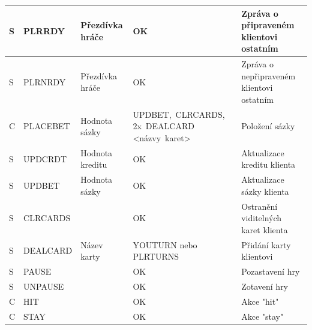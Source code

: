 \documentclass[12pt]{article}
\begin{document}
\begin{table}[]
\begin{tabular}{|l|l|l|p{5.5cm}|p{3cm}|}
S          & PLRRDY          & Přezdívka hráče & OK                                                                & Zpráva o připraveném klientovi ostatním             \\ \hline
S          & PLRNRDY         & Přezdívka hráče & OK                                                                & Zpráva o nepřipraveném klientovi ostatním           \\ \hline
C          & PLACEBET        & Hodnota sázky   & UPDBET,~CLRCARDS, 2x~DEALCARD                \textless{}názvy~karet\textgreater{} & Položení sázky                                      \\ \hline
S          & UPDCRDT         & Hodnota kreditu & OK                                                                & Aktualizace kreditu klienta                         \\ \hline
S          & UPDBET          & Hodnota sázky   & OK                                                                & Aktualizace sázky klienta                           \\ \hline
S          & CLRCARDS        &                 & OK                                                                & Ostranění viditelných karet klienta                 \\ \hline
S          & DEALCARD        & Název karty     & YOUTURN  nebo PLRTURNS                                            & Přidání karty klientovi                             \\ \hline
S          & PAUSE           &                 & OK                                                                & Pozastavení hry                                     \\ \hline
S          & UNPAUSE         &                 & OK                                                                & Zotavení hry                                        \\ \hline
C          & HIT             &                 & OK                                                                & Akce "hit"                                          \\ \hline
C          & STAY            &                 & OK                                                                & Akce "stay"                                         \\ \hline
\end{tabular}
\end{table}
\end{document}
